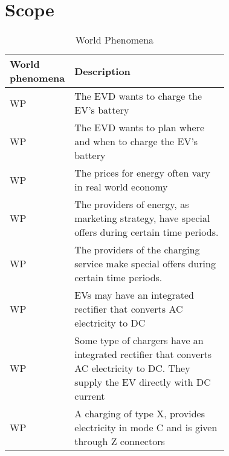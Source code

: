 \section{Scope}
\label{sec:Scope}%
\setcounter{wp}{1}
\newcommand{\wpcount}{\thewp\stepcounter{wp}}
\begin{table}[H]
    \centering
    \begin{tabular}{|l|p{0.725\linewidth}|}
     \hline
     \textbf{World phenomena} & \textbf{Description} \\
     \hline
     WP\wpcount & The EVD wants to charge the EV's battery \\
     \hline
     WP\wpcount & The EVD wants to plan where and when to charge the EV's battery \\
     \hline
     WP\wpcount & The prices for energy often vary in real world economy \\ 
     \hline
     WP\wpcount & The providers of energy, as marketing strategy, have special offers during certain time periods.\\
     \hline
     WP\wpcount & The providers of the charging service make special offers during certain time periods.\\
     \hline
     WP\wpcount & EVs may have an integrated rectifier that converts AC electricity to DC \\
     \hline
     WP\wpcount & Some type of chargers have an integrated rectifier that converts AC electricity to DC. They supply the EV directly with DC current \\
     \hline
     WP\wpcount & A charging of type X, provides electricity in mode C and is given through Z connectors \\
     \hline
\end{tabular}
    \caption{World Phenomena}
    \label{tab:World Phenomena}
\end{table}

